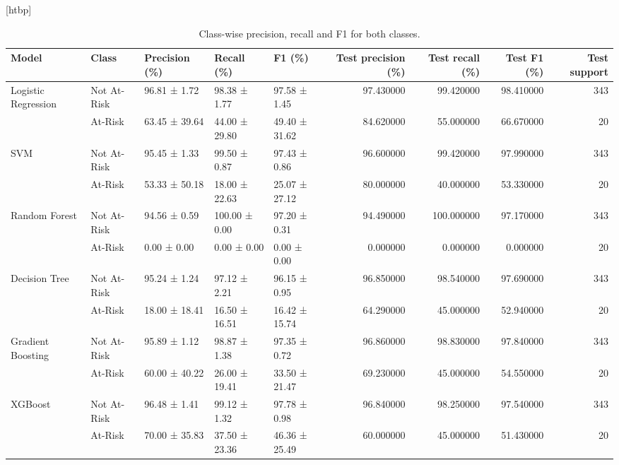 \begin{table}
\small[htbp]
\caption{Class-wise precision, recall and F1 for both classes.}
\label{tab:T07_classwise}
\begin{tabular}{lllllrrrr}
\toprule
Model & Class & Precision (\%) & Recall (\%) & F1 (\%) & Test precision (\%) & Test recall (\%) & Test F1 (\%) & Test support \\
\midrule
Logistic Regression & Not At-Risk & 96.81 ± 1.72 & 98.38 ± 1.77 & 97.58 ± 1.45 & 97.430000 & 99.420000 & 98.410000 & 343 \\
 & At-Risk & 63.45 ± 39.64 & 44.00 ± 29.80 & 49.40 ± 31.62 & 84.620000 & 55.000000 & 66.670000 & 20 \\
SVM & Not At-Risk & 95.45 ± 1.33 & 99.50 ± 0.87 & 97.43 ± 0.86 & 96.600000 & 99.420000 & 97.990000 & 343 \\
 & At-Risk & 53.33 ± 50.18 & 18.00 ± 22.63 & 25.07 ± 27.12 & 80.000000 & 40.000000 & 53.330000 & 20 \\
Random Forest & Not At-Risk & 94.56 ± 0.59 & 100.00 ± 0.00 & 97.20 ± 0.31 & 94.490000 & 100.000000 & 97.170000 & 343 \\
 & At-Risk & 0.00 ± 0.00 & 0.00 ± 0.00 & 0.00 ± 0.00 & 0.000000 & 0.000000 & 0.000000 & 20 \\
Decision Tree & Not At-Risk & 95.24 ± 1.24 & 97.12 ± 2.21 & 96.15 ± 0.95 & 96.850000 & 98.540000 & 97.690000 & 343 \\
 & At-Risk & 18.00 ± 18.41 & 16.50 ± 16.51 & 16.42 ± 15.74 & 64.290000 & 45.000000 & 52.940000 & 20 \\
Gradient Boosting & Not At-Risk & 95.89 ± 1.12 & 98.87 ± 1.38 & 97.35 ± 0.72 & 96.860000 & 98.830000 & 97.840000 & 343 \\
 & At-Risk & 60.00 ± 40.22 & 26.00 ± 19.41 & 33.50 ± 21.47 & 69.230000 & 45.000000 & 54.550000 & 20 \\
XGBoost & Not At-Risk & 96.48 ± 1.41 & 99.12 ± 1.32 & 97.78 ± 0.98 & 96.840000 & 98.250000 & 97.540000 & 343 \\
 & At-Risk & 70.00 ± 35.83 & 37.50 ± 23.36 & 46.36 ± 25.49 & 60.000000 & 45.000000 & 51.430000 & 20 \\
\bottomrule
\end{tabular}
\end{table}
